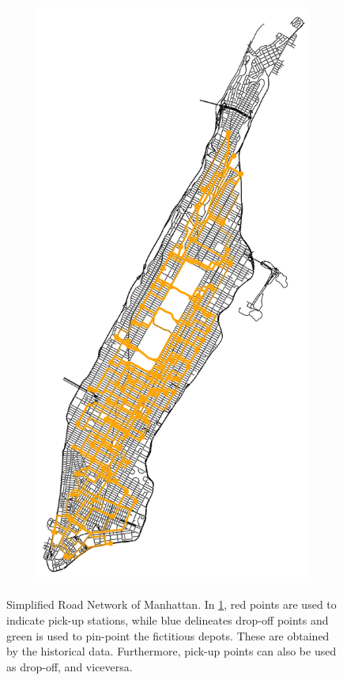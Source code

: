 \begin{figure}[t]
\begin{subfigure}[b]{0.35\textwidth}
		\caption{}
		\label{fig:nyc_rn_info}
	\end{subfigure}
	\begin{subfigure}[b]{0.35\textwidth}
		\centering
		\includegraphics[width=\textwidth]{assets/img/07_graph_based/new_york_vanilla_no_info.png}
		\caption{}
		\label{fig:nyc_rn_roads}
	\end{subfigure}
	\caption[Simplified Road Network of Manhattan]{Simplified Road Network of Manhattan. In \ref{fig:nyc_rn_info}, red points are used to indicate pick-up stations, while blue delineates drop-off points and green is used to pin-point the fictitious depots. These are obtained by the historical data. Furthermore, pick-up points can also be used as drop-off, and viceversa.  }
	\label{fig:nyc_rn}
\end{figure}
